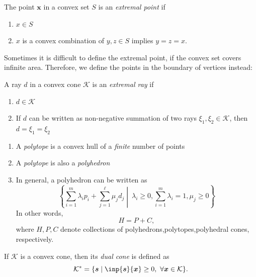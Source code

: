 \begin{definition}
The point $\bm x$ in a convex set $S$ is an \emph{extremal point} if
\begin{enumerate}
\item
$x\in S$
\item
$x$ is a convex combination of $y,z\in S$ implies $y=z=x$.
\end{enumerate}
\end{definition}

Sometimes it is difficult to define the extremal point, if the convex set covers infinite area. Therefore, we define the points in the boundary of vertices instead:
\begin{definition}
A ray $d$ in a convex cone $\mathcal{K}$ is an \emph{extremal ray} if
\begin{enumerate}
\item
$d\in\mathcal{K}$
\item
If $d$ can be written as non-negative summation of two rays $\xi_1,\xi_2\in\mathcal{K}$, then $d=\xi_1=\xi_2$
\end{enumerate}
\end{definition}

\begin{definition}
\begin{enumerate}
\item
A \emph{polytope} is a convex hull of a \emph{finite} number of points
\item
A \emph{polytope} is also a \emph{polyhedron}
\item
In general, a polyhedron can be written as
\[
\left\{
\sum_{i=1}^m\lambda_ip_i
+
\sum_{j=1}^{\ell}\mu_jd_j
\middle|\
\lambda_i\ge0,
\sum_{i=1}^m\lambda_i=1,
\mu_j\ge0
\right\}
\]
In other words, 
\[
H=P+C,
\]
where $H,P,C$ denote collections of polyhedrons,polytopes,polyhedral cones, respectively.
\end{enumerate}
\end{definition}

\begin{definition}
If $\mathcal{K}$ is a convex cone, then its \emph{dual cone} is defined as
\[
\mathcal{K}^*=\{\bm s\mid\inp{\bm s}{\bm x}\ge0,\ \forall \bm x\in\mathcal{K}\}.
\]
\end{definition}


